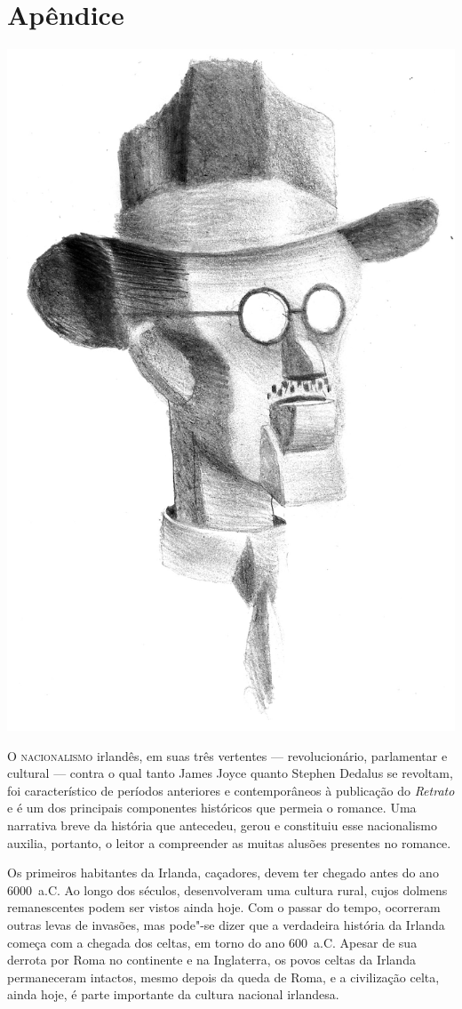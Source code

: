 
\part{Apêndice}


\begin{center}
\includegraphics[width=.6\textwidth]{./joyce3.jpg}
\end{center}




\noindent\textsc{O nacionalismo} irlandês, em suas três vertentes ---  revolucionário,
parlamentar e cultural --- contra o qual tanto James Joyce quanto Stephen
Dedalus se revoltam, foi característico de períodos anteriores e
contemporâneos à publicação do \textit{Retrato} e é um dos principais
componentes históricos que permeia o romance. Uma narrativa breve da
história que antecedeu, gerou e constituiu esse nacionalismo auxilia,
portanto, o leitor a compreender as muitas alusões presentes no
romance. 

Os primeiros habitantes da Irlanda, caçadores, devem ter chegado antes
do ano 6000~a.C. Ao longo dos séculos, desenvolveram uma cultura rural,
cujos dolmens remanescentes podem ser vistos ainda hoje. Com o passar
do tempo, ocorreram outras levas de invasões, mas pode"-se dizer que a
verdadeira história da Irlanda começa com a chegada dos celtas, em
torno do ano 600~a.C. Apesar de sua derrota por Roma no continente e na
Inglaterra, os povos celtas da Irlanda permaneceram intactos, mesmo
depois da queda de Roma, e a civilização celta, ainda hoje, é parte
importante da cultura nacional irlandesa.

